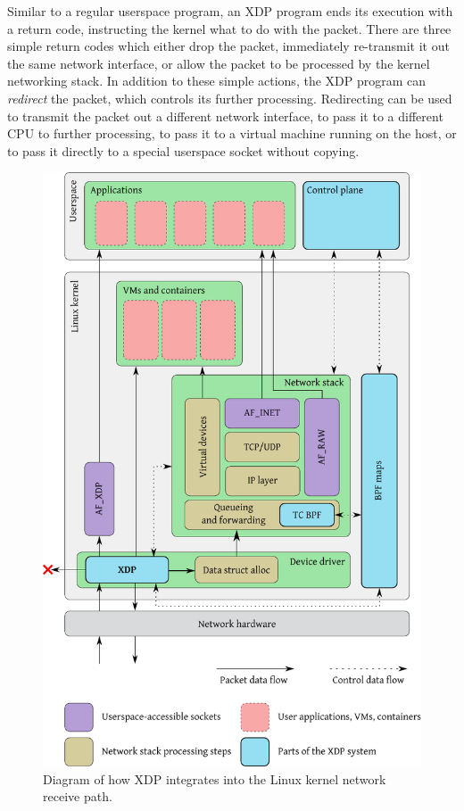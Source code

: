 \documentclass[10pt,sigconf]{acmart}
\begin{document}
Similar to a regular userspace program, an XDP program ends its execution with a
return code, instructing the kernel what to do with the packet. There are three
simple return codes which either drop the packet, immediately re-transmit it out
the same network interface, or allow the packet to be processed by the kernel
networking stack. In addition to these simple actions, the XDP program can
\emph{redirect} the packet, which controls its further processing. Redirecting
can be used to transmit the packet out a different network interface, to pass it
to a different CPU to further processing, to pass it to a virtual machine
running on the host, or to pass it directly to a special userspace socket
without copying.

\begin{figure}[t]
\centering
\includegraphics[width=\linewidth]{figures/kernel-diagram.pdf}
\caption{\label{fig:xdp-kernel} Diagram of how XDP integrates into the Linux
  kernel network receive path.}
\end{figure}
\end{document}
